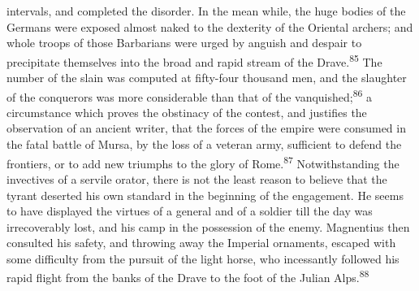 intervals, and completed the disorder. In the mean while, the
huge bodies of the Germans were exposed almost naked to the
dexterity of the Oriental archers; and whole troops of those
Barbarians were urged by anguish and despair to precipitate
themselves into the broad and rapid stream of the Drave.\textsuperscript{85} The
number of the slain was computed at fifty-four thousand men, and
the slaughter of the conquerors was more considerable than that
of the vanquished;\textsuperscript{86} a circumstance which proves the obstinacy
of the contest, and justifies the observation of an ancient
writer, that the forces of the empire were consumed in the fatal
battle of Mursa, by the loss of a veteran army, sufficient to
defend the frontiers, or to add new triumphs to the glory of
Rome.\textsuperscript{87} Notwithstanding the invectives of a servile orator,
there is not the least reason to believe that the tyrant deserted
his own standard in the beginning of the engagement. He seems to
have displayed the virtues of a general and of a soldier till the
day was irrecoverably lost, and his camp in the possession of the
enemy. Magnentius then consulted his safety, and throwing away
the Imperial ornaments, escaped with some difficulty from the
pursuit of the light horse, who incessantly followed his rapid
flight from the banks of the Drave to the foot of the Julian
Alps.\textsuperscript{88}





